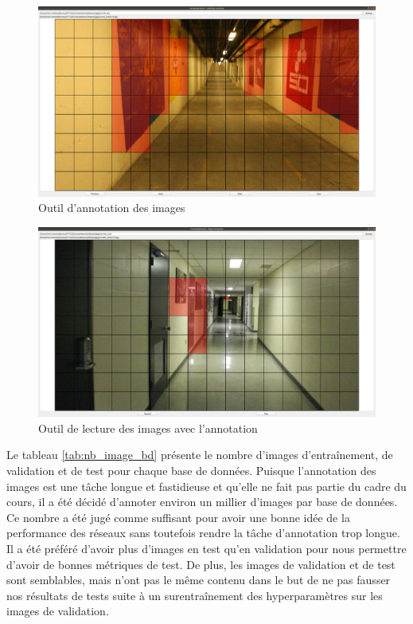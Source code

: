     \begin{figure}
        \centering
        \includegraphics[width=15cm]{images/outil_annotation.png}
        \caption{Outil d'annotation des images}
        \label{fig:outil_annotation}
    \end{figure}

    \begin{figure}
        \centering
        \includegraphics[width=15cm]{images/outil_lecture.png}
        \caption{Outil de lecture des images avec l'annotation}
        \label{fig:outil_lecture}
    \end{figure}

    Le tableau \ref{tab:nb_image_bd} présente le nombre d'images d'entraînement, de validation et de test pour chaque base de données. Puisque l'annotation des images est une tâche longue et fastidieuse et qu'elle ne fait pas partie du cadre du cours, il a été décidé d'annoter environ un millier d'images par base de données. Ce nombre a été jugé comme suffisant pour avoir une bonne idée de la performance des réseaux sans toutefois rendre la tâche d'annotation trop longue. Il a été préféré d'avoir plus d'images en test qu'en validation pour nous permettre d'avoir de bonnes métriques de test. De plus, les images de validation et de test sont semblables, mais n'ont pas le même contenu dans le but de ne pas fausser nos résultats de tests suite à un surentraînement des hyperparamètres sur les images de validation. 
    
